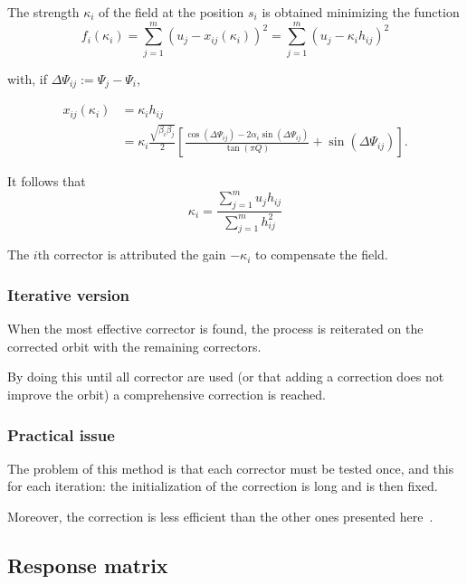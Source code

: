 The strength $\kappa_i$ of the field at the position $s_i$ is obtained minimizing the function
\begin{equation}
    \label{eq:gain_bestcorr}
    f_i(\kappa_i) = \sum\limits_{j=1}^{m} (u_j-x_{ij}(\kappa_i))^2 
                  = \sum\limits_{j=1}^{m} (u_j- \kappa_i h_{ij})^2
\end{equation}

with, if $\Delta \Psi_{ij} := \Psi_j-\Psi_i$,

\begin{align}
    \label{eq:hij}
    x_{ij}(\kappa_i) &= \kappa_i h_{ij} \nonumber\\
                     &= \kappa_i \frac{\sqrt{\beta_i \beta_j}}{2}
                         \left[
                             \frac{\cos(\Delta \Psi_{ij}) - 2\alpha_i \sin(\Delta\Psi_{ij})}
                                  {\tan (\pi Q)} + \sin (\Delta\Psi_{ij})
                         \right].
\end{align}

It follows that 
\begin{equation}
    \kappa_i = \frac{\sum\limits_{j=1}^m u_j h_{ij}}{\sum\limits_{j=1}^m h_{ij}^2}
\end{equation}

The $i$th corrector is attributed the gain $-\kappa_i$ to compensate the field.

\subsubsection{Iterative version}
When the most effective corrector is found, the process is reiterated on the corrected orbit with the remaining correctors. 

By doing this until all corrector are used (or that adding a correction does not improve the orbit) a comprehensive correction is reached.

\subsubsection{Practical issue}
The problem of this method is that each corrector must be tested once, and this for each iteration: the initialization of the correction is long and is then fixed.

Moreover, the correction is less efficient than the other ones presented here~\cite{book:wille}.

\subsection{Response matrix}
\label{sec:response_matrix}

